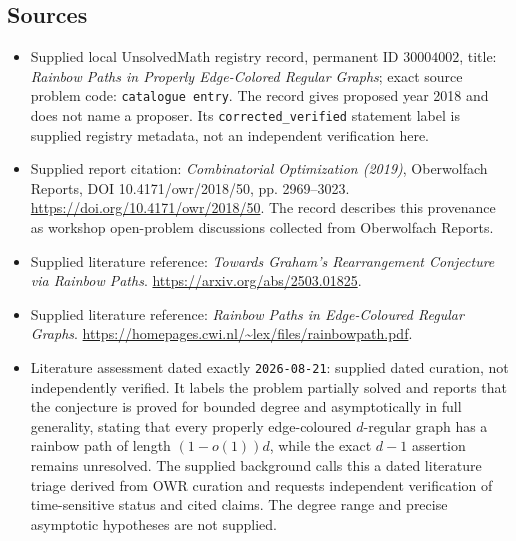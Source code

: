 \documentclass[11pt]{article}
\begin{document}
\subsection{Sources}
\begin{itemize}
\item Supplied local UnsolvedMath registry record, permanent ID \(30004002\), title: \emph{Rainbow Paths in Properly Edge-Colored Regular Graphs}; exact source problem code: \texttt{catalogue entry}. The record gives proposed year 2018 and does not name a proposer. Its \texttt{corrected\_verified} statement label is supplied registry metadata, not an independent verification here.
\item Supplied report citation: \emph{Combinatorial Optimization (2019)}, Oberwolfach Reports, DOI 10.4171/owr/2018/50, pp. 2969--3023. \url{https://doi.org/10.4171/owr/2018/50}. The record describes this provenance as workshop open-problem discussions collected from Oberwolfach Reports.
\item Supplied literature reference: \emph{Towards Graham's Rearrangement Conjecture via Rainbow Paths}. \url{https://arxiv.org/abs/2503.01825}.
\item Supplied literature reference: \emph{Rainbow Paths in Edge-Coloured Regular Graphs}. \url{https://homepages.cwi.nl/~lex/files/rainbowpath.pdf}.
\item Literature assessment dated exactly \texttt{2026-08-21}: supplied dated curation, not independently verified. It labels the problem partially solved and reports that the conjecture is proved for bounded degree and asymptotically in full generality, stating that every properly edge-coloured \(d\)-regular graph has a rainbow path of length \((1-o(1))d\), while the exact \(d-1\) assertion remains unresolved. The supplied background calls this a dated literature triage derived from OWR curation and requests independent verification of time-sensitive status and cited claims. The degree range and precise asymptotic hypotheses are not supplied.
\end{itemize}
\end{document}

